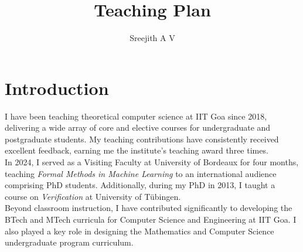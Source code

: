 \documentclass[11pt,a4paper,sans]{moderncv} %
\title{Teaching Plan}
\author{Sreejith A V}
\date{}
\begin{document}
\makecvtitle %
\section{Introduction}
I have been teaching theoretical computer science at IIT Goa since 2018, delivering a wide array of core and elective courses for undergraduate and postgraduate students. My teaching contributions have consistently received excellent feedback, earning me the institute's teaching award three times. \\

In 2024, I served as a Visiting Faculty at University of Bordeaux for four months, teaching \textit{Formal Methods in Machine Learning} to an international audience comprising PhD students. Additionally, during my PhD in 2013, I taught a course on \textit{Verification} at University of Tübingen. \\

Beyond classroom instruction, I have contributed significantly to developing the BTech and MTech curricula for Computer Science and Engineering at IIT Goa. I also played a key role in designing the Mathematics and Computer Science undergraduate program curriculum.
\end{document}
